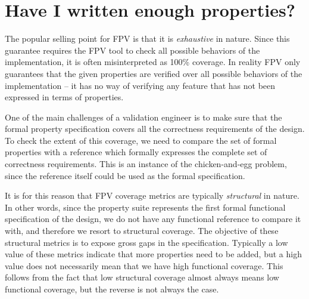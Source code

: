 \section{Have I written enough properties?}
The popular selling point for FPV is that it is {\em exhaustive} in nature.
Since this guarantee requires the FPV tool to check all possible behaviors
of the implementation, it is often misinterpreted as 100\% coverage. In
reality FPV only guarantees that the given properties are verified over all
possible behaviors of the implementation -- it has no way of verifying
any feature that has not been expressed in terms of properties.

One of the main challenges of a validation engineer is to make sure that
the formal property specification covers all the correctness requirements
of the design. To check the extent of this coverage, we need to compare the 
set of formal properties with a reference which formally expresses the
complete set of correctness requirements. This is an instance of the
chicken-and-egg problem, since the reference itself could be used as the
formal specification.

It is for this reason that FPV coverage metrics are typically {\em structural}
in nature. In other words, since the property suite represents the first 
formal functional specification of the design, we do not have any functional
reference to compare it with, and therefore we resort to structural coverage.
The objective of these structural metrics is to expose gross gaps in the
specification. Typically a low value of these metrics indicate that more
properties need to be added, but a high value does not necessarily mean that
we have high functional coverage. This follows from the fact that low
structural coverage almost always means low functional coverage, but the
reverse is not always the case.


